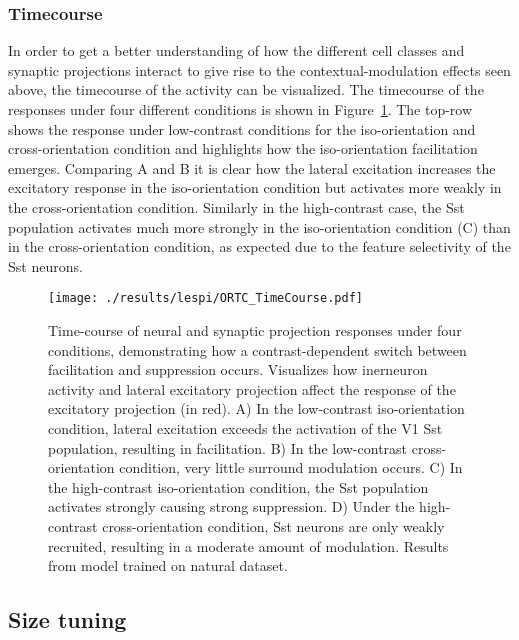\subsubsection*{Timecourse}

In order to get a better understanding of how the different cell
classes and synaptic projections interact to give rise to the
contextual-modulation effects seen above, the timecourse of the
activity can be visualized. The timecourse of the responses under four
different conditions is shown in Figure~\ref{ORTC_TimeCourse}. The
top-row shows the response under low-contrast conditions for the
iso-orientation and cross-orientation condition and highlights how the
iso-orientation facilitation emerges. Comparing A and B it is clear 
how the lateral excitation increases the excitatory response in
the iso-orientation condition but activates more weakly in the
cross-orientation condition. Similarly in the high-contrast case, the
Sst population activates much more strongly in the iso-orientation
condition (C) than in the cross-orientation condition, as expected due
to the feature selectivity of the Sst neurons.

\begin{figure}
	\centering
        \texttt{[image: ./results/lespi/ORTC\_TimeCourse.pdf]}
	\caption[Time-course of neural and synaptic projection responses
      under four conditions, demonstrating how a contrast-dependent
      switch between facilitation and suppression occurs]{Time-course
      of neural and synaptic projection responses under four
      conditions, demonstrating how a contrast-dependent switch
      between facilitation and suppression occurs. Visualizes how
      inerneuron activity and lateral excitatory projection affect the
      response of the excitatory projection (in red). A) In the
      low-contrast iso-orientation condition, lateral excitation
      exceeds the activation of the V1 Sst population, resulting in
      facilitation. B) In the low-contrast cross-orientation
      condition, very little surround modulation occurs. C) In the
      high-contrast iso-orientation condition, the Sst population
      activates strongly causing strong suppression. D) Under the
      high-contrast cross-orientation condition, Sst neurons are only
      weakly recruited, resulting in a moderate amount of modulation.
      Results from model trained on natural dataset.}
	\label{ORTC_TimeCourse}
\end{figure}

\subsection{Size tuning}

